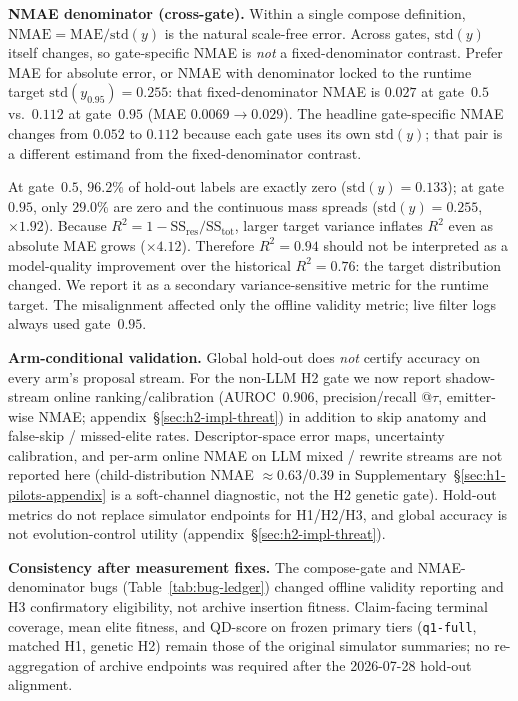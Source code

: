 \documentclass[preprint,12pt]{elsarticle}
\begin{document}
\textbf{NMAE denominator (cross-gate).} Within a single compose definition, $\mathrm{NMAE}=\mathrm{MAE}/\mathrm{std}(y)$ is the natural scale-free error. Across gates, $\mathrm{std}(y)$ itself changes, so gate-specific NMAE is \emph{not} a fixed-denominator contrast. Prefer MAE for absolute error, or NMAE with denominator locked to the runtime target $\mathrm{std}(y_{0.95}){=}0.255$: that fixed-denominator NMAE is $0.027$ at gate~$0.5$ vs.\ $0.112$ at gate~$0.95$ (MAE $0.0069\!\rightarrow\!0.029$). The headline gate-specific NMAE changes from $0.052$ to $0.112$ because each gate uses its own $\mathrm{std}(y)$; that pair is a different estimand from the fixed-denominator contrast.

At gate~$0.5$, $96.2\%$ of hold-out labels are exactly zero ($\mathrm{std}(y){=}0.133$); at gate~$0.95$, only $29.0\%$ are zero and the continuous mass spreads ($\mathrm{std}(y){=}0.255$, $\times 1.92$). Because $R^{2}{=}1{-}\mathrm{SS}_{\mathrm{res}}/\mathrm{SS}_{\mathrm{tot}}$, larger target variance inflates $R^{2}$ even as absolute MAE grows ($\times 4.12$). Therefore $R^{2}{=}0.94$ should not be interpreted as a model-quality improvement over the historical $R^{2}{=}0.76$: the target distribution changed. We report it as a secondary variance-sensitive metric for the runtime target. The misalignment affected only the offline validity metric; live filter logs always used gate~$0.95$.

\textbf{Arm-conditional validation.} Global hold-out does \emph{not} certify accuracy on every arm's proposal stream. For the non-LLM H2 gate we now report shadow-stream online ranking/calibration (AUROC~$0.906$, precision/recall @$\tau$, emitter-wise NMAE; appendix~\S\ref{sec:h2-impl-threat}) in addition to skip anatomy and false-skip / missed-elite rates. Descriptor-space error maps, uncertainty calibration, and per-arm online NMAE on LLM mixed / rewrite streams are not reported here (child-distribution NMAE ${\approx}0.63$/$0.39$ in Supplementary~\S\ref{sec:h1-pilots-appendix} is a soft-channel diagnostic, not the H2 genetic gate). Hold-out metrics do not replace simulator endpoints for H1/H2/H3, and global accuracy is not evolution-control utility (appendix~\S\ref{sec:h2-impl-threat}).

\textbf{Consistency after measurement fixes.} The compose-gate and NMAE-denominator bugs (Table~\ref{tab:bug-ledger}) changed offline validity reporting and H3 confirmatory eligibility, not archive insertion fitness. Claim-facing terminal coverage, mean elite fitness, and QD-score on frozen primary tiers (\texttt{q1-full}, matched H1, genetic H2) remain those of the original simulator summaries; no re-aggregation of archive endpoints was required after the 2026-07-28 hold-out alignment.
\end{document}
